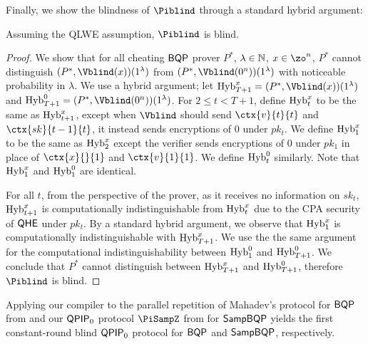 Finally, we show the blindness of $\Piblind$ through a standard hybrid argument:
\begin{thm} \label{thm:compiler-blindness}
	Assuming the QLWE assumption, $\Piblind$ is blind.
\end{thm}
\begin{proof}
	We show that for all cheating $\operatorname{\mathsf{BQP}}$ prover $P^*$, $\lambda\in\mathbb{N}$, $x\in\zo^n$,
	$P^*$ cannot distinguish $(P^*, \Vblind(x))(1^\lambda)$ from $(P^*, \Vblind(0^n))(1^\lambda)$ with noticeable probability in $\lambda$.
	We use a hybrid argument; let $\Hyb_{T+1}^x=(P^*, \Vblind(x))(1^\lambda)$ and $\Hyb_{T+1}^0=(P^*, \Vblind(0^n))(1^\lambda)$.
	For $2\leq t<T+1$, define $\operatorname{Hyb}_t^x$ to be the same as $\operatorname{Hyb}_{t+1}^x$,
	except when $\Vblind$ should send $\ctx{v}{t}{t}$ and $\ctx{sk}{t-1}{t}$, it instead sends encryptions of $0$ under $pk_t$.
	We define $\operatorname{Hyb}_1^x$ to be the same as $\operatorname{Hyb}_2^x$ except the verifier sends encryptions of $0$ under $pk_1$ in place of $\ctx{x}{}{1}$ and $\ctx{v}{1}{1}$.
	We define $\operatorname{Hyb}_t^0$ similarly. Note that $\operatorname{Hyb}_1^x$ and $\operatorname{Hyb}_1^0$ are identical.

	For all $t$, from the perspective of the prover,
	as it receives no information on $sk_t$,
	$\operatorname{Hyb}_{t+1}^x$ is computationally indistinguishable from $\operatorname{Hyb}_t^x$ due to the CPA security of $\mathsf{QHE}$ under $pk_t$.
	By a standard hybrid argument, we observe that $\operatorname{Hyb}_1^x$ is computationally indistinguishable with $\operatorname{Hyb}_{T+1}^x$.
	We use the the same argument for the computational indistinguishability between $\operatorname{Hyb}_1^0$ and $\operatorname{Hyb}_{T+1}^0$.
	We conclude that $P^*$ cannot distinguish between $\operatorname{Hyb}_{T+1}^x$ and $\operatorname{Hyb}_{T+1}^0$,
	therefore $\Piblind$ is blind.
\end{proof}

Applying our compiler to the parallel repetition of Mahadev's protocol for $\operatorname{\mathsf{BQP}}$ from \cite{arXiv:ChiaChungYam19, arXiv:AlaChiHun19} and our $\operatorname{\mathsf{QPIP}}_0$ protocol $\PiSampZ$ from  for $\operatorname{\mathsf{SampBQP}}$ yields the first constant-round blind $\operatorname{\mathsf{QPIP}}_0$ protocol for $\operatorname{\mathsf{BQP}}$ and $\operatorname{\mathsf{SampBQP}}$, respectively.



